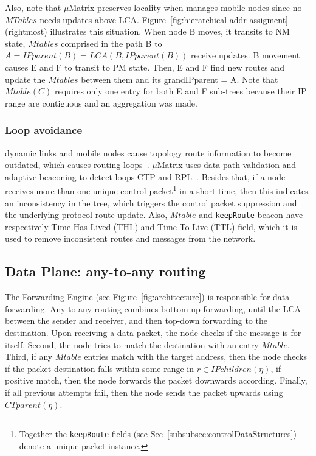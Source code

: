 Also, note that $\mu$Matrix preserves locality when manages mobile nodes since no $MTables$ needs updates above LCA. Figure~\ref{fig:hierarchical-addr-assigment} (rightmost) illustrates this situation. When node B moves, it transits to NM state, $Mtables$ comprised in the path B to $A = IPparent(B) = LCA(B, IPparent(B))$ receive updates. B movement causes E and F to transit to PM state. Then, E and F find new routes and update the $Mtables$ between them and its grandIPparent = A. Note that $Mtable(C)$ requires only one entry for both E and F sub-trees because their IP range are contiguous and an aggregation was made.

\subsubsection{Loop avoidance}
dynamic links and mobile nodes cause topology route information to become outdated, which causes routing loops~\cite{ctptosn2014}. $\mu$Matrix uses data path validation and adaptive beaconing to detect loops CTP and RPL~\cite{ctptosn2014, lee2012rpl}. Besides that, if a node receives more than one unique control packet\footnote{Together the \texttt{keepRoute} fields (see Sec~\ref{subsubsec:controlDataStructures}) denote a unique packet instance.} in a short time, then this indicates an inconsistency in the tree, which triggers the control packet suppression and the underlying protocol route update. Also, $Mtable$ and \texttt{keepRoute} beacon have respectively Time Has Lived (THL) and Time To Live (TTL) field, which it is used to remove inconsistent routes and messages from the network.

\subsection{Data Plane: any-to-any routing}
\label{subsec:data-plane}

The Forwarding Engine (see Figure~\ref{fig:architecture}) is responsible for data forwarding. Any-to-any routing combines bottom-up forwarding, until the LCA between the sender and receiver, and then top-down forwarding to the destination. Upon receiving a data packet, the node checks if the message is for itself.
Second, the node tries to match the destination with an entry $Mtable$. Third, if any $Mtable$ entries match with the target address, then the node checks if the packet destination falls within some range in $r \in IPchildren(\eta)$, if positive match, then the node forwards the packet downwards according. Finally,  if all previous attempts fail, then the node sends the packet upwards using $CTparent(\eta)$.